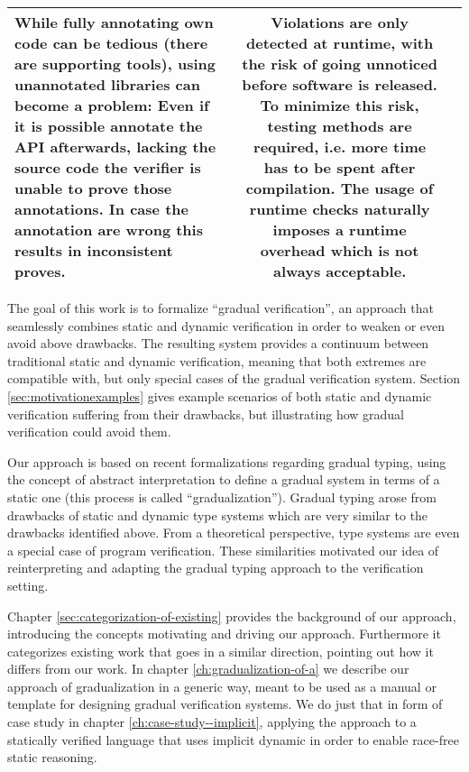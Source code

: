 \begin{tabular}{l | c | c}
\begin{minipage}{170pt}
        While fully annotating own code can be tedious (there are supporting tools), using unannotated libraries can become a problem:
        Even if it is possible annotate the API afterwards, lacking the source code the verifier is unable to prove those annotations.
        In case the annotation are wrong this results in inconsistent proves.
        \vspace{5pt}
    \end{minipage}
    &
    \begin{minipage}{170pt}
        \vspace{3pt}
        Violations are only detected at runtime, with the risk of going unnoticed before software is released.
        To minimize this risk, testing methods are required, i.e. more time has to be spent after compilation.
        The usage of runtime checks naturally imposes a runtime overhead which is not always acceptable.
        \vspace{5pt}
    \end{minipage}\\\hline
\end{tabular}


The goal of this work is to formalize “gradual verification”, an approach that seamlessly combines static and dynamic verification in order to weaken or even avoid above drawbacks.
The resulting system provides a continuum between traditional static and dynamic verification, meaning that both extremes are compatible with, but only special cases of the gradual verification system.
Section \ref{sec:motivationexamples} gives example scenarios of both static and dynamic verification suffering from their drawbacks, but illustrating how gradual verification could avoid them.

Our approach is based on recent formalizations regarding gradual typing, using the concept of abstract interpretation to define a gradual system in terms of a static one (this process is called “gradualization”).
Gradual typing arose from drawbacks of static and dynamic type systems which are very similar to the drawbacks identified above.
From a theoretical perspective, type systems are even a special case of program verification. 
These similarities motivated our idea of reinterpreting and adapting the gradual typing approach to the verification setting.

Chapter \ref{sec:categorization-of-existing} provides the background of our approach, introducing the concepts motivating and driving our approach.
Furthermore it categorizes existing work that goes in a similar direction, pointing out how it differs from our work.
In chapter \ref{ch:gradualization-of-a} we describe our approach of gradualization in a generic way, meant to be used as a manual or template for designing gradual verification systems.
We do just that in form of case study in chapter \ref{ch:case-study--implicit}, applying the approach to a statically verified language that uses implicit dynamic in order to enable race-free static reasoning.

